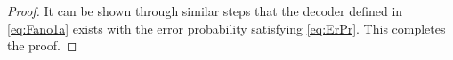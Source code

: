 \documentclass[journal, twocolumn, 10pt]{IEEEtran}
\newtheorem{lemma}{Lemma}
\newcommand{\cF}{{\mathcal{F}}}
\newcommand{\cG}{{\mathcal{G}}}
\newcommand{\eps}{\varepsilon}
\newcommand{\rvf}{{\mathssf{f}}}    %
\newcommand{\rvs}{{\mathssf{s}}}    %
\begin{document}
{\begin{proof}
It can be shown through similar steps that the decoder defined in \eqref{eq:Fano1a} exists with the error probability satisfying \eqref{eq:ErPr}.  
This completes the proof.
\end{proof}
}
%   
%
\end{document}

